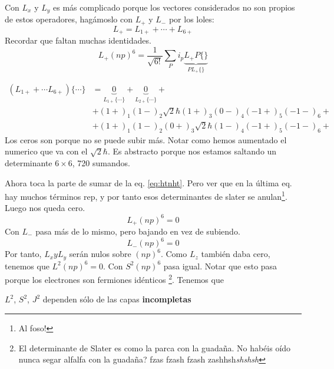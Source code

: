 Con $L_x$ y $L_y$ es más complicado porque los vectores considerados
no son propios de estos operadores, hagámoslo con $L_+$ y $L_-$ por
los loles:
\begin{equation}
  L_+ = L_{1+} + \cdots + L_{6+}
\end{equation}
Recordar que faltan muchas identidades.
\begin{equation}
  L_+(np)^6 = \frac{1}{\sqrt{6!}} \sum_{P} i_p \underbrace{L_+
    P\{\}}_{P L_+\{\}} 
  \label{eq:htnht}
\end{equation}

\begin{equation}
  \begin{split}
    (L_{1+}+\cdots L_{6+})\{\cdots\} &=
    \underbrace{0}_{L_{1+}\{\cdots\}} +
    \underbrace{0}_{{L_{2+}\{\cdots\}}} + \\ &+ (1+)_1(1-)_2\sqrt{2} \hbar
    (1+)_3 (0-)_4(-1+)_5(-1-)_6 + \\ &+ (1+)_1(1-)_2 (0+)_3 \sqrt{2}
    \hbar(1-)_4(-1+)_5(-1-)_6 +
  \end{split}
\end{equation}
Los ceros son porque no se puede subir más. Notar como hemos aumentado
el numerico que va con el $\sqrt{2}\hbar$. Es abstracto porque nos
estamos saltando un determinante $6\times6$, 720 sumandos.

Ahora toca la parte de sumar de la eq. \ref{eq:htnht}. Pero ver que en
la última eq. hay muchos términos rep, y por tanto esos determinantes
de slater se anulan\footnote{Al foso!}. Luego nos queda cero.
\begin{equation}
  L_+ (np)^6 = 0
\end{equation}
Con $L_-$ pasa más de lo mismo, pero bajando en vez de subiendo.
\begin{equation}
  L_- (np)^6 = 0
\end{equation}
Por tanto, $L_x y L_y$ serán nulos sobre $(np)^6$. Como $L_z$ también
daba cero, tenemos que $L^2(np)^6=0$. Con $S^2(np)^6$ pasa igual.
Notar que esto pasa porque los electrones son fermiones idénticos
\footnote{El determinante de Slater es como la parca con la guadaña.
  No habéis oído nunca segar alfalfa con la guadaña? fzas fzash fzash
  zashhsh\emph{shshsh}}. Tenemos que

\begin{center}
  $L^2$, $S^2$, $J^2$ dependen sólo de las capas
  \bfseries{incompletas}
\end{center}



